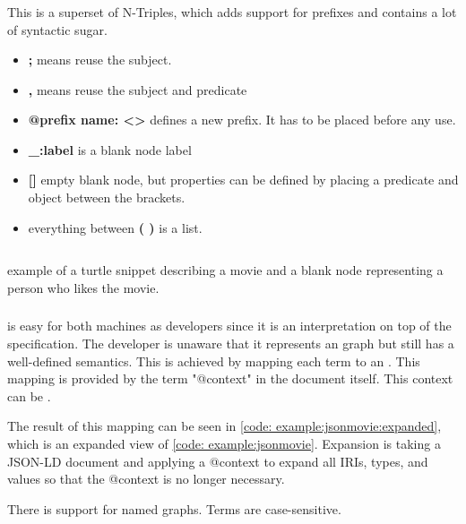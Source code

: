 \subsubsection{}
This is a superset of N-Triples, which adds support for prefixes and contains a lot of syntactic sugar. 
\begin{itemize}

    \item \textbf{;} means reuse the subject.
    \item \textbf{,} means reuse the subject and predicate
    \item \textbf{@prefix name: <>} defines a new prefix. It has to be placed before any use.
    \item \textbf{\_:label} is a blank node label
    \item \textbf{[]} empty blank node, but properties can be defined by placing a predicate and object between the brackets.
    \item everything between \textbf{( )} is a list.
    
\end{itemize}
\begin{listing}[H]
    \inputminted[linenos,frame=single]{Turtle}{code/example_turtle.ttl}
    \caption{example of a turtle snippet describing a movie and a blank node representing a person who likes the movie.}
    \label{code:example:turtle}
\end{listing}
\subsubsection{}
 is easy for both machines as developers since it is an interpretation on top of the  specification. The developer is unaware that it represents an  graph but still has a well-defined semantics. This is achieved by mapping each term to an . This mapping is provided by the term "@context" in the document itself. This context can be . 

The result of this mapping can be seen in \autoref{code: example:jsonmovie:expanded}, which is an expanded view of \autoref{code: example:jsonmovie}. Expansion is taking a JSON-LD document and applying a @context to expand all IRIs, types, and values so that the @context is no longer necessary. 

There is support for named graphs.
Terms are case-sensitive. 


